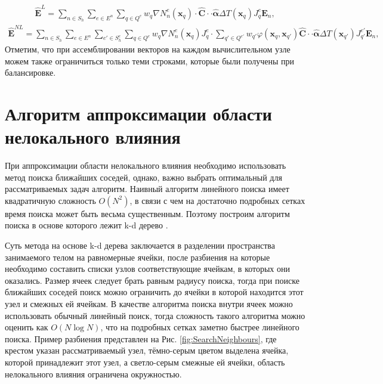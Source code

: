 \begin{gather*}
	\widehat{\textbf{E}}^L = 
	\sum\limits_{n \in S_h}
	\sum\limits_{e \in E^n}
	\sum\limits_{q \in Q^e}
	w_q \nabla N_n^e (\boldsymbol{x}_q) \cdot \widehat{\mathbf{C}} \cdot \cdot \widehat{\boldsymbol{\alpha}} \Delta T (\boldsymbol{x}_q) J_q^e \boldsymbol{E}_n,
\end{gather*}
\begin{gather*}
	\widehat{\textbf{E}}^{NL} = 
	\sum\limits_{n \in S_h}
	\sum\limits_{e \in E^n}
	\sum\limits_{e' \in S_h^e}
	\sum\limits_{q \in Q^e}
	w_q \nabla N_n^e (\boldsymbol{x}_q) J_q^e \cdot
	\sum\limits_{q' \in Q^{e'}}
	w_{q'} \varphi (\boldsymbol{x}_q, \boldsymbol{x}_{q'}) \widehat{\mathbf{C}} \cdot \cdot \widehat{\boldsymbol{\alpha}} \Delta T (\boldsymbol{x}_{q'}) J_{q'}^{e'} \boldsymbol{E}_n,
\end{gather*}
Отметим, что при ассемблировании векторов на каждом вычислительном узле можем также ограничиться только теми строками, которые были получены при балансировке.

\section{Алгоритм аппроксимации области нелокального влияния}\label{sec:ProgramComplex/SearchMeighbours}

При аппроксимации области нелокального влияния необходимо использовать метод поиска ближайших соседей, однако, важно выбрать оптимальный для рассматриваемых задач алгоритм. Наивный алгоритм линейного поиска имеет квадратичную сложность $O (N^2)$, в связи с чем на достаточно подробных сетках время поиска может быть весьма существенным. Поэтому построим алгоритм поиска в основе которого лежит k-d дерево \cite{kdtree}.

Суть метода на основе k-d дерева заключается в разделении пространства занимаемого телом на равномерные ячейки, после разбиения на которые необходимо составить списки узлов соответствующие ячейкам, в которых они оказались. Размер ячеек следует брать равным радиусу поиска, тогда при поиске ближайших соседей поиск можно ограничить до ячейки в которой находится этот узел и смежных ей ячейкам. В качестве алгоритма поиска внутри ячеек можно использовать обычный линейный поиск, тогда сложность такого алгоритма можно оценить как $O(N \log N)$, что на подробных сетках заметно быстрее линейного поиска. Пример разбиения представлен на Рис. \ref{fig:SearchNeighbours}, где крестом указан рассматриваемый узел, тёмно-серым цветом выделена ячейка, которой принадлежит этот узел, а светло-серым смежные ей ячейки, область нелокального влияния ограничена окружностью.

